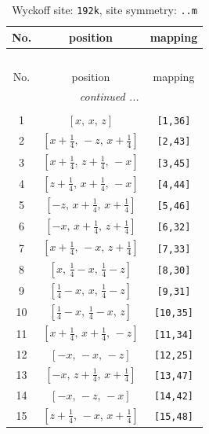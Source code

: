 \documentclass[fleqn,8pt]{jsarticle}
\begin{document}
\begin{longtable}{ccc}
\caption{Wyckoff site: {\tt 192k}, site symmetry: {\tt ..m}}
 \\
 \hline \hline
No. & position & mapping \\ \hline \endfirsthead

\multicolumn{2}{l}{\tablename\ \thetable{}} \\
 \hline \hline
No. & position & mapping \\ \hline \endhead

 \hline \hline
\multicolumn{2}{r}{\footnotesize\it continued ...} \\ \endfoot

 \hline \hline
\multicolumn{2}{r}{} \\ \endlastfoot

1 & $\left[ x,\, x,\, z \right]$ & {\tt [1,36]} \\ \hline
2 & $\left[ x + \frac{1}{4},\, - z,\, x + \frac{1}{4} \right]$ & {\tt [2,43]} \\ \hline
3 & $\left[ x + \frac{1}{4},\, z + \frac{1}{4},\, - x \right]$ & {\tt [3,45]} \\ \hline
4 & $\left[ z + \frac{1}{4},\, x + \frac{1}{4},\, - x \right]$ & {\tt [4,44]} \\ \hline
5 & $\left[ - z,\, x + \frac{1}{4},\, x + \frac{1}{4} \right]$ & {\tt [5,46]} \\ \hline
6 & $\left[ - x,\, x + \frac{1}{4},\, z + \frac{1}{4} \right]$ & {\tt [6,32]} \\ \hline
7 & $\left[ x + \frac{1}{4},\, - x,\, z + \frac{1}{4} \right]$ & {\tt [7,33]} \\ \hline
8 & $\left[ x,\, \frac{1}{4} - x,\, \frac{1}{4} - z \right]$ & {\tt [8,30]} \\ \hline
9 & $\left[ \frac{1}{4} - x,\, x,\, \frac{1}{4} - z \right]$ & {\tt [9,31]} \\ \hline
10 & $\left[ \frac{1}{4} - x,\, \frac{1}{4} - x,\, z \right]$ & {\tt [10,35]} \\ \hline
11 & $\left[ x + \frac{1}{4},\, x + \frac{1}{4},\, - z \right]$ & {\tt [11,34]} \\ \hline
12 & $\left[ - x,\, - x,\, - z \right]$ & {\tt [12,25]} \\ \hline
13 & $\left[ - x,\, z + \frac{1}{4},\, x + \frac{1}{4} \right]$ & {\tt [13,47]} \\ \hline
14 & $\left[ - x,\, - z,\, - x \right]$ & {\tt [14,42]} \\ \hline
15 & $\left[ z + \frac{1}{4},\, - x,\, x + \frac{1}{4} \right]$ & {\tt [15,48]} \\ \hline

\end{longtable}
\end{document}
